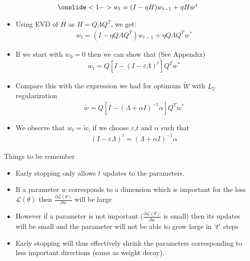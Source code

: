 \begin{frame}
	\begin{align*}
		\onslide<1->w_t=(I-\eta H)w_{t-1}+\eta H w^{*} 
	\end{align*}
	\begin{itemize}
		\justifying
		\item<2-> Using EVD of $H$ as $H=Q \Lambda Q^{T}$, we get:
		\begin{align*}
			w_t=(I-\eta Q \Lambda Q^{T} )w_{t-1}+\eta Q \Lambda Q^{T} w^{*} 
		\end{align*}
		\item<3-> If we start with $w_{0}=0$ then we can show that (See Appendix)
		\begin{align*}
			w_t=Q[I-(I-\varepsilon \Lambda)^{t}]Q^{T}w^{*} 
		\end{align*}
		\item<4-> Compare this with the expression we had for optimum $\tilde{W}$ with $L_2$ regularization
		\begin{align*}
			\tilde{w}=Q[I-(\Lambda+ \alpha I)^{-1} \alpha]Q^{T}w^{*} 
		\end{align*}
		\item<5-> We observe that $w_t=\tilde{w}$, if we choose $
		\varepsilon$,$t$ and $\alpha$ such that 
		\begin{align*}
			(I-\varepsilon \Lambda)^{t}=(\Lambda+ \alpha I)^{-1} \alpha 
		\end{align*}
	\end{itemize}
\end{frame}

\begin{frame}
	\begin{block}{Things to be remember}
		\begin{itemize}
			\justifying
			\item<1-> Early stopping only allows $t$ updates to the parameters.
			\item<2-> If a parameter $w$ corresponds to a dimension which is important for the loss $\mathscr{L}(\theta)$ then $\frac{\partial \mathscr{L}(\theta)}{\partial w}$ will be large
			\item<4-> However if a parameter is not important ($\frac{\partial \mathscr{L}(\theta)}{\partial w}$ is small) then its updates will be small and the parameter will not be able to grow large in $`t'$ steps
			\item<5-> Early stopping will thus effectively shrink the parameters corresponding to less important directions (same as weight decay).
		\end{itemize}
	\end{block}
\end{frame}
